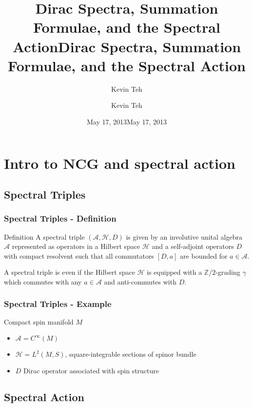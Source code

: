 \documentclass{beamer}
\title{Dirac Spectra, Summation Formulae, and the Spectral Action} \author{Kevin Teh} \date{May 17, 2013}
\title{Dirac Spectra, Summation Formulae, and the Spectral Action}
\author{Kevin Teh}
\institute{Caltech}
\date{May 17, 2013}
\def\Z{{\mathbb Z}}
\def\cA{{\mathcal A}}
\def\cH{{\mathcal H}}
\begin{document}
\begin{frame}
\titlepage
\end{frame}

\section{Intro to NCG and spectral action}

\subsection{Spectral Triples}
\begin{frame}
  \frametitle{Spectral Triples - Definition}
  \begin{block}{Definition}
    A spectral triple $(\cA, \cH, D)$ is given by an involutive unital algebra $\cA$ represented as operators in a Hilbert space $\cH$ and a self-adjoint operators $D$ with compact resolvent such that all commutators $[D, a]$ are bounded for $a \in \cA$.
  \end{block}
  \pause

  \begin{block}{}
    A spectral triple is even if the Hilbert space $\cH$ is equipped with a $\Z /2 $-grading $\gamma$ which commutes with any $a \in \cA$ and anti-commutes with $D$.
\end{block}
\end{frame}


\begin{frame}
  \frametitle{Spectral Triples - Example}
  \begin{exampleblock}{Compact spin manifold $M$}
    \begin{itemize}
      \item $\cA = C^{\infty}(M)$
      \item $\cH = L^2(M, S)$, square-integrable sections of spinor bundle
      \item $D$ Dirac operator associated with spin structure
    \end{itemize}
  \end{exampleblock}
\end{frame}

\subsection{Spectral Action}
\end{document}
